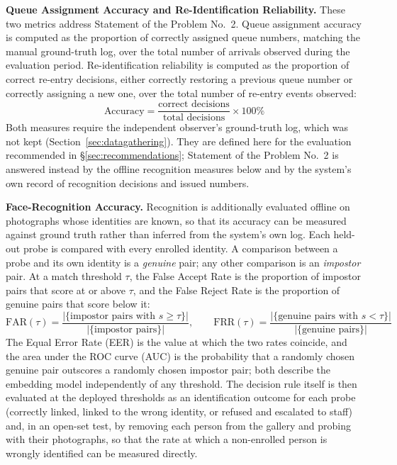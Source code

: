 \documentclass{research}
\begin{document}
\textbf{Queue Assignment Accuracy and Re-Identification Reliability.}
These two metrics address Statement of the Problem No.~2. Queue
assignment accuracy is computed as the proportion of correctly assigned
queue numbers, matching the manual ground-truth log, over the total
number of arrivals observed during the evaluation period.
Re-identification reliability is computed as the proportion of correct
re-entry decisions, either correctly restoring a previous queue number
or correctly assigning a new one, over the total number of re-entry
events observed:
\begin{equation}
  \text{Accuracy} =
  \frac{\text{correct decisions}}{\text{total decisions}} \times 100\%
  \label{eq:accuracy}
\end{equation}
Both measures require the independent observer's ground-truth log,
which was not kept (Section~\ref{sec:datagathering}). They are defined
here for the evaluation recommended in \S\ref{sec:recommendations}; Statement of the
Problem No.~2 is answered instead by the offline recognition measures
below and by the system's own record of recognition decisions and
issued numbers.

\textbf{Face-Recognition Accuracy.} Recognition is additionally
evaluated offline on photographs whose identities are known, so that its
accuracy can be measured against ground truth rather than inferred from
the system's own log. Each held-out probe is compared with every
enrolled identity. A comparison between a probe and its own identity is
a \emph{genuine} pair; any other comparison is an \emph{impostor} pair.
At a match threshold $\tau$, the False Accept Rate is the proportion of
impostor pairs that score at or above $\tau$, and the False Reject Rate
is the proportion of genuine pairs that score below it:
\begin{equation}
  \text{FAR}(\tau) =
  \frac{\left|\{\text{impostor pairs with } s \geq \tau\}\right|}
       {\left|\{\text{impostor pairs}\}\right|}, \qquad
  \text{FRR}(\tau) =
  \frac{\left|\{\text{genuine pairs with } s < \tau\}\right|}
       {\left|\{\text{genuine pairs}\}\right|}
  \label{eq:far-frr}
\end{equation}
The Equal Error Rate (EER) is the value at which the two rates coincide,
and the area under the ROC curve (AUC) is the probability that a
randomly chosen genuine pair outscores a randomly chosen impostor pair;
both describe the embedding model independently of any threshold. The
decision rule itself is then evaluated at the deployed thresholds as an
identification outcome for each probe (correctly linked, linked to
the wrong identity, or refused and escalated to staff) and, in an
open-set test, by removing each person from the gallery and probing
with their photographs, so that the rate at which a non-enrolled person
is wrongly identified can be measured directly.
\end{document}
